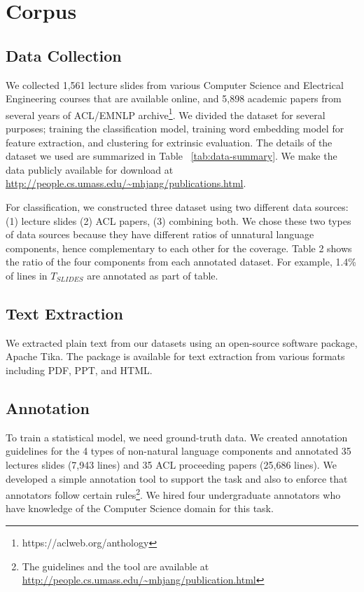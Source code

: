 \documentclass[11pt,letterpaper]{article}
\begin{document}
\section{Corpus}
\subsection{Data Collection}
We collected 1,561 lecture slides from various Computer Science and Electrical Engineering courses that are available online, and 5,898 academic papers from several years of ACL/EMNLP archive\footnote{https://aclweb.org/anthology}. We divided the dataset for several purposes; training the classification model, training word embedding model for feature extraction, and clustering for extrinsic evaluation. The details of the dataset we used are summarized in Table ~\ref{tab:data-summary}. We make the data publicly available for download at \url{http://people.cs.umass.edu/~mhjang/publications.html}. 

For classification, we constructed three dataset using two different data sources: (1) lecture slides (2) ACL papers, (3) combining both. We chose these two types of data sources because they have different ratios of unnatural language components, hence complementary to each other for the coverage. Table 2 shows the ratio of the four components from each annotated dataset. For example, 1.4\% of lines in $T_{SLIDES}$ are annotated as part of table. 

\subsection{Text Extraction}
We extracted plain text from our datasets using an open-source software package, Apache Tika. The package is available for text extraction from various formats including PDF, PPT, and HTML.

\subsection{Annotation}
To train a statistical model, we need ground-truth data. We created annotation guidelines for the 4 types of non-natural language components and annotated 35 lectures slides (7,943 lines) and 35 ACL proceeding papers (25,686 lines). We developed a simple annotation tool to support the task and also to enforce that annotators follow certain rules\footnote{The guidelines and the tool are available at \url{http://people.cs.umass.edu/~mhjang/publication.html}}. We hired four undergraduate annotators who have knowledge of the Computer Science domain for this task. 
\end{document}
